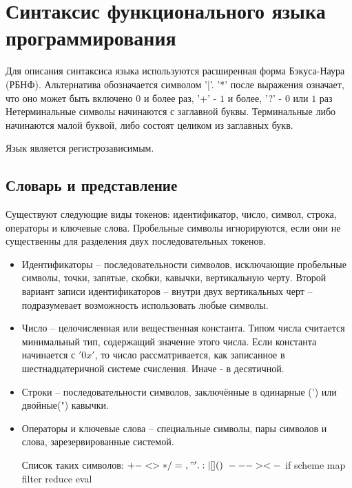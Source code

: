 \section{Синтаксис функционального языка программирования}
    Для описания синтаксиса языка используются расширенная форма Бэкуса-Наура (РБНФ). 
    Альтернатива обозначается символом '|'. 
    '*' после выражения означает, что оно может быть включено $0$ и более раз, '+' - $1$ и более, '?' - $0$ или $1$ раз%
    Нетерминальные символы начинаются с заглавной буквы. 
    Терминальные либо начинаются малой буквой, либо состоят целиком из заглавных букв.

    Язык является регистрозависимым.

    \subsection{Словарь и представление}
        Существуют следующие виды токенов: идентификатор, число, символ, строка, операторы и ключевые слова.
        Пробельные символы игнорируются, если они не существенны для разделения двух последовательных токенов.

        \begin{itemize}
            \item Идентификаторы -- последовательности символов, исключающие пробельные символы, точки, запятые, скобки, кавычки, вертикальную черту.
            Второй вариант записи идентификаторов -- внутри двух вертикальных черт -- подразумевает возможность использовать любые символы.

            
            \item Число -- целочисленная или вещественная константа. Типом числа считается минимальный тип, содержащий значение этого числа. 
            Если константа начинается с $'0x'$, то число рассматривается, как записанное в шестнадцатеричной системе счисления. 
            Иначе - в десятичной.
            
            
            \item Строки -- последовательности символов, заключённые в одинарные (') или двойные(") кавычки.
                
            \item Операторы и ключевые слова -- специальные символы, пары символов и слова, зарезервированные системой.

            Список таких символов: $ + - < > * / = ~ , " ' . : | [ ] ( ) { } \ -- -> <-$ if scheme map filter reduce eval
        \end{itemize}
